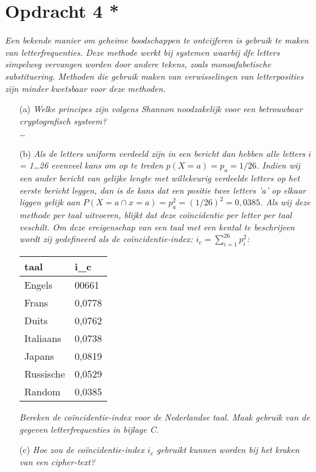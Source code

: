 \section{Opdracht 4 *}
\emph{Een bekende manier om geheime boodschappen te ontcijferen is gebruik te maken van letterfrequenties. Deze methode werkt bij systemen waarbij dfe letters simpelweg vervangen worden door andere tekens, zoals monoafabetische substituering. Methoden die gebruik maken van verwisselingen van letterposities zijn minder kwetsbaar voor deze methoden.}

\begin{itemize}
  \item[(a)] \emph{Welke principes zijn volgens Shannon noodzakelijk voor een betrouwbaar cryptografisch systeem?}\\
  \ldots

  \item[(b)] \emph{Als de letters uniform verdeeld zijn in een bericht dan hebben alle letters $i$ = 1\ldots26 evenveel kans om op te treden $p(X=a)=p_a=1/26$. Indien wij een ander bericht van gelijke lengte met willekeurig verdeelde letters op het eerste bericht leggen, dan is de kans dat een positie twee letters 'a' op elkaar liggen gelijk aan $P(X=a\cap x = a)=p_a^2=(1/26)^2=0,0385$. Als wij deze methode per taal uitvoeren, blijkt dat deze co\"{i}ncidentie per letter per taal veschilt. Om deze ereigenschap van een taal met een kental te beschrijven wordt zij gedefineerd als de \emph{co\"{i}ncidentie-index}: $i_c=\sum ^{26}_{i=1} p^2_i$:}

\begin{center}
\begin{tabular}{ll}
  taal & i_c \\
  \hline
  Engels & 00661 \\ 
  Frans & 0,0778 \\
  Duits & 0,0762 \\
  Italiaans & 0,0738 \\
  Japans & 0,0819 \\
  Russische & 0,0529 \\
  Random & 0,0385 \\
\end{tabular}
\end{center}

\emph{Bereken de co\"{i}ncidentie-index voor de Nederlandse taal. Maak gebruik van de gegeven letterfrequenties in bijlage C.}
   \item[(c)] \emph{Hoe zou de co\"{i}ncidentie-index $i_c$ gebruikt kunnen worden bij het kraken van een cipher-text?}\\

\end{itemize}

